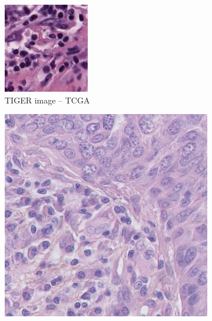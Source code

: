 \begin{figure}[H]
  \par\vspace{1em} %

  \begin{subfigure}[b]{0.32\textwidth}
    \centering
    \includegraphics[width=\linewidth]{assets/images/for_presentation/image_TCGA-EW-A1P8-01Z-00-DX1.E9852193-8CDD-49EF-B49B-DA6931198F0D_[8391, 13690, 8532, 13838].png}
    \caption{TIGER image – TCGA}
    \label{fig:tiger-tcga}
  \end{subfigure}\quad
  \begin{subfigure}[b]{0.32\textwidth}
    \centering
    \includegraphics[width=\linewidth]{assets/images/for_presentation/image_10_1.png}

\end{subfigure}
\end{figure}
